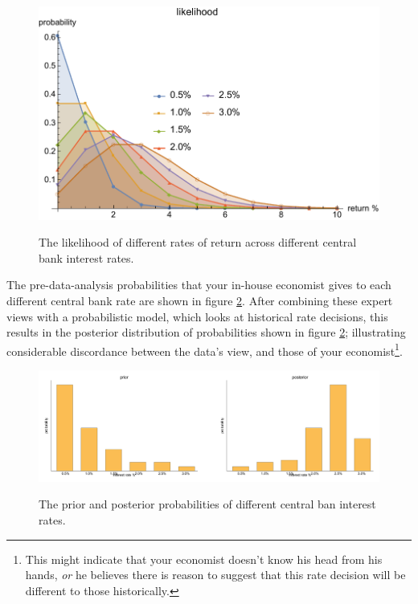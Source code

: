 \documentclass[11pt,fullpage]{book}
\begin{document}
\begin{figure}
\centering
\scalebox{0.65} 
{\includegraphics{Posterior_likelihoodInterestRate.pdf}}
\caption{The likelihood of different rates of return across different central bank interest rates.}\label{fig:Posterior_likelihoodInterestRate}
\end{figure}

The pre-data-analysis probabilities that your in-house economist gives to each different central bank rate are shown in figure \ref{fig:Posterior_priorPosteriorInterestRate}. After combining these expert views with a probabilistic model, which looks at historical rate decisions, this results in the posterior distribution of probabilities shown in figure \ref{fig:Posterior_priorPosteriorInterestRate}; illustrating considerable discordance between the data's view, and those of your economist\footnote{This might indicate that your economist doesn't know his head from his hands, \textit{or} he believes there is reason to suggest that this rate decision will be different to those historically.}.

\begin{figure}
\centering
\scalebox{0.45} 
{\includegraphics{Posterior_priorPosteriorInterestRate.pdf}}
\caption{The prior and posterior probabilities of different central ban interest rates.}\label{fig:Posterior_priorPosteriorInterestRate}
\end{figure}
\end{document}

